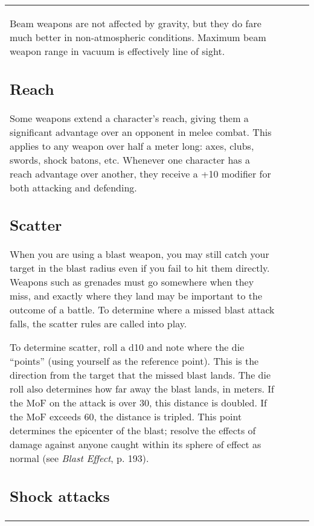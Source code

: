 \begin{table}
\begin{tabular}{|p{8cm}|r|r|r|}
Beam weapons are not affected by gravity, but they do fare much better in non-atmospheric conditions. Maximum beam weapon range in vacuum is effectively line of sight. 



\subsection{Reach} \label{sec:reach} 

Some weapons extend a character’s reach, giving them a significant advantage over an opponent in melee combat. This applies to any weapon over half a meter long: axes, clubs, swords, shock batons, etc. Whenever one character has a reach advantage over another, they receive a +10 modifier for both attacking and defending. 



\subsection{Scatter} \label{sec:scatter} 

When you are using a blast weapon, you may still catch your target in the blast radius even if you fail to hit them directly. Weapons such as grenades must go somewhere when they miss, and exactly where they land may be important to the outcome of a battle. To determine where a missed blast attack falls, the scatter rules are called into play. 

To determine scatter, roll a d10 and note where the die ``points'' (using yourself as the reference point). This is the direction from the target that the missed blast lands. The die roll also determines how far away the blast lands, in meters. If the MoF on the attack is over 30, this distance is doubled. If the MoF exceeds 60, the distance is tripled. This point determines the epicenter of the blast; resolve the effects of damage against anyone caught within its sphere of effect as normal (see \emph{Blast Effect}, p. 193). 



\subsection{Shock attacks} \label{sec:shock-attacks} 


\end{tabular}
\end{table}
